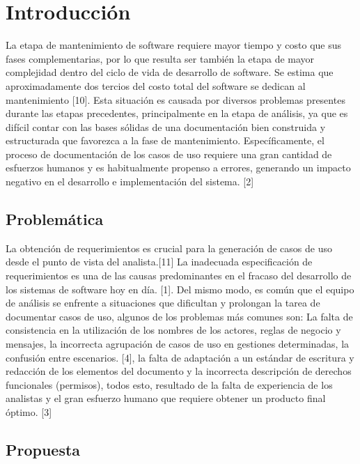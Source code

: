\chapter{Introducción}

La etapa de mantenimiento de software requiere mayor tiempo y costo que sus fases complementarias, por lo que resulta ser también la etapa de mayor complejidad dentro del ciclo de vida de desarrollo de software. Se estima que aproximadamente dos tercios del costo total del software se dedican al mantenimiento [10]. Esta situación es causada por diversos problemas presentes durante las etapas precedentes, principalmente en la etapa de análisis, ya que es difícil contar con las bases sólidas de una documentación bien construida y estructurada que favorezca a la fase de  mantenimiento. Específicamente, el proceso de documentación de los casos de uso requiere una gran cantidad de esfuerzos humanos y es habitualmente propenso a errores, generando un impacto negativo en el desarrollo e implementación del sistema. [2]


	

\section{Problemática}

La obtención de requerimientos es crucial para la generación de casos de uso desde el punto de vista del analista.[11] La inadecuada especificación de requerimientos es una de las causas predominantes en el fracaso del desarrollo de los sistemas de software hoy en día. [1]. Del mismo modo, es común que el equipo de análisis se enfrente a situaciones que dificultan y prolongan la tarea de documentar casos de uso, algunos de los problemas más comunes son: La falta de consistencia en la utilización de los nombres de los actores, reglas de negocio y mensajes, la incorrecta agrupación de casos de uso en gestiones determinadas, la confusión entre escenarios. [4], la falta de adaptación a un estándar de escritura y redacción de los elementos del documento y la incorrecta descripción de derechos funcionales (permisos),  todos esto, resultado de la falta de experiencia de los analistas y el gran esfuerzo humano que requiere obtener un producto final óptimo. [3] 


	
\section{Propuesta}

